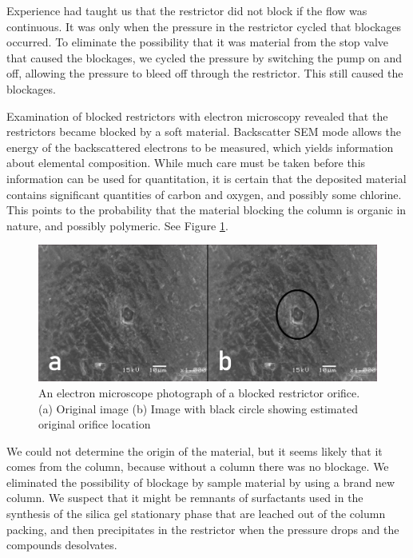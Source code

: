 Experience had taught us that the restrictor did not block if the flow was
continuous. It was only when the pressure in the restrictor cycled that
blockages occurred. To eliminate the possibility that it was material from the
stop valve that caused the blockages, we cycled the pressure by switching the
pump on and off, allowing the pressure to bleed off through the restrictor. This
still caused the blockages.

Examination of blocked restrictors with electron microscopy revealed that the
restrictors became blocked by a soft material. Backscatter SEM mode allows the
energy of the backscattered electrons to be measured, which yields information
about elemental composition. While much care must be taken before this
information can be used for quantitation, it is certain that the deposited
material contains significant quantities of carbon and oxygen, and possibly some
chlorine. This points to the probability that the material blocking the column
is organic in nature, and possibly polymeric. See Figure \ref{fig:restrictorblockage}.

\begin{figure}
\centering
\includegraphics[width=\textwidth]{Figures/Blockage_1920.png}
\decoRule

\caption[A electron microscope photo of a blocked restrictor orifice]{An
electron microscope photograph of a blocked restrictor orifice. (a) Original
image (b) Image with black circle showing estimated original orifice location}

\label{fig:restrictorblockage}
\end{figure}



We could not determine the origin of the material, but it seems likely that it
comes from the column, because without a column there was no blockage. We
eliminated the possibility of blockage by sample material by using a brand new
column. We suspect that it might be remnants of surfactants used in the
synthesis of the silica gel stationary phase that are leached out of the column
packing, and then precipitates in the restrictor when the pressure drops and the
compounds desolvates.

